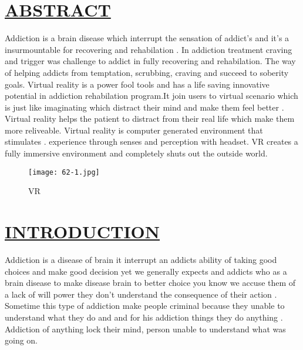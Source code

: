 \documentclass[12pts]{article}
\begin{document}
\section*{\underline{ABSTRACT} }
\begin{Large}
\begin{flushleft}
 Addiction is a brain disease which interrupt the sensation of 
addict’s and it’s a insurmountable for recovering and rehabilation . In addiction 
treatment craving and trigger was challenge to addict in fully recovering and 
rehabilation. The way of helping addicts from temptation, scrubbing, craving 
and succeed to soberity goals. Virtual reality is a power fool tools and has a life 
saving innovative potential in addiction rehabilation program.It join users to 
virtual scenario which is just like imaginating which distract their mind and 
make them feel better . Virtual reality helps the patient to distract from their 
real life which make them more reliveable. Virtual reality is computer 
generated environment that stimulates . experience through senses and 
perception with headset. VR creates a fully immersive environment and 
completely shuts out the outside world.
\end{flushleft}

\end{Large}

\begin{figure}[h]
\centering
\texttt{[image: 62-1.jpg]}
\caption{VR}
\end{figure}

\section{\underline{INTRODUCTION} }
\begin{Large}
\begin{flushleft}


Addiction is a disease of brain it interrupt an addicts ability of 
taking good choices and make good decision yet we generally expects and 
addicts who as a brain disease to make disease brain to better choice you 
know we accuse them of a lack of will power they don’t understand the 
consequence of their action . Sometime this type of addiction make people 
criminal because they unable to understand what they do and and for his 
addiction things they do anything . Addiction of anything lock their mind, 
person unable to understand what was going on.
\end{flushleft}
\end{Large}
\end{document}
